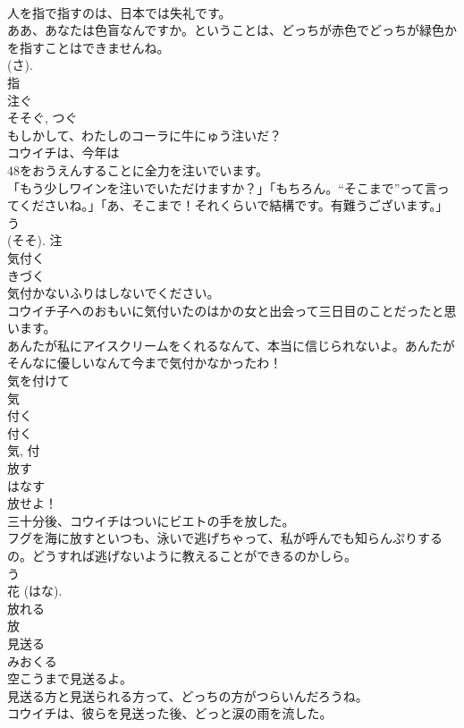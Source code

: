 \documentclass[8pt]{extreport}
\begin{document}
\begin{CJK}{UTF8}{min}
\\	人を指で指すのは、日本では失礼です。	
\\	ああ、あなたは色盲なんですか。ということは、どっちが赤色でどっちが緑色かを指すことはできませんね。	
\\	(さ). 
\\	指	
\\	注ぐ	
\\	そそぐ, つぐ	
\\	もしかして、わたしのコーラに牛にゅう注いだ？	
\\	コウイチは、今年は
\\	48をおうえんすることに全力を注いでいます。	
\\	「もう少しワインを注いでいただけますか？」「もちろん。“そこまで”って言ってくださいね。」「あ、そこまで！それくらいで結構です。有難うございます。」	
\\	う 
\\	(そそ).	注	
\\	気付く	
\\	きづく	
\\	気付かないふりはしないでください。	
\\	コウイチ子へのおもいに気付いたのはかの女と出会って三日目のことだったと思います。	
\\	あんたが私にアイスクリームをくれるなんて、本当に信じられないよ。あんたがそんなに優しいなんて今まで気付かなかったわ！	
\\	気を付けて 
\\	気 
\\	付く 
\\	付く 
\\	気, 付	
\\	放す	
\\	はなす	
\\	放せよ！	
\\	三十分後、コウイチはついにビエトの手を放した。	
\\	フグを海に放すといつも、泳いで逃げちゃって、私が呼んでも知らんぷりするの。どうすれば逃げないように教えることができるのかしら。	
\\	う 
\\	花 (はな). 
\\	放れる 
\\	放	
\\	見送る	
\\	みおくる	
\\	空こうまで見送るよ。	
\\	見送る方と見送られる方って、どっちの方がつらいんだろうね。	
\\	コウイチは、彼らを見送った後、どっと涙の雨を流した。	

\end{CJK}
\end{document}
